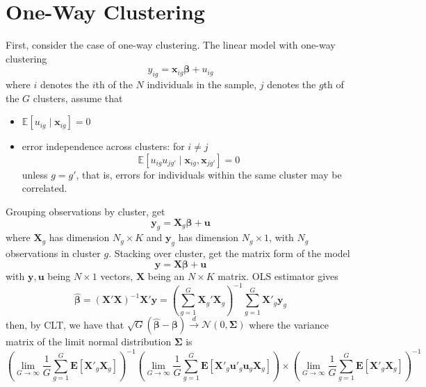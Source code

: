 \documentclass[twoside]{article}
\begin{document}

\section{One-Way Clustering}\label{sec:oneway_cluster}
First, consider the case of one-way clustering. The linear model with one-way clustering $$ y_{ig} = \mathbf{x}_{ig}\boldsymbol{\beta} + u_{ig} $$
where $i$ denotes the $i$th of the $N$ individuals in the sample, $j$ denotes the $g$th of the $G$ clusters, assume that
\begin{itemize}
    \item $\mathbb{E}\left[u_{ig}\mid \mathbf{x}_{ig}\right] =0$
    \item error independence across clusters: for $i\neq j$
    \begin{equation}\label{eq:error_independence}
        \mathbb{E}\left[ u_{ig} u_{jg'}\mid \mathbf{x}_{ig},\mathbf{x}_{jg'} \right] = 0
    \end{equation}
    unless $g=g'$, that is, errors for individuals within the same cluster may be correlated.
\end{itemize}
Grouping observations by cluster, get
$$
\mathbf{y}_g = \mathbf{X}_g \boldsymbol{\beta} + \mathbf{u}
$$
where $\mathbf{X}_g$ has dimension $N_g\times K$ and $\mathbf{y}_g$ has dimension $N_g \times 1$, with $N_g$ observations in cluster $g$. 
Stacking over cluster, get the matrix form of the model
$$
\mathbf{y=X}\boldsymbol{\beta}+\mathbf{u}
$$
with $\mathbf{y,u}$ being $N\times 1$ vectors, $\mathbf{X}$ being an $N\times K$ matrix. OLS estimator gives 
\begin{equation}\label{eq:OLSest}
    \hat{\boldsymbol{\beta}} = \left(\mathbf{X'X}\right)^{-1}\mathbf{X'y}=\left( \sum^G_{g=1}\mathbf{X}_g'\mathbf{X}_g \right)^{-1} \sum^G_{g=1}\mathbf{X}'_g\mathbf{y}_g
\end{equation}
then, by CLT, we have that $\sqrt{G} \left(\hat{\boldsymbol{\beta}}-\boldsymbol{\beta}\right) \xrightarrow{d} \mathcal{N}(0,\boldsymbol{\Sigma})$ where the variance matrix of the limit normal distribution $\boldsymbol{\Sigma}$ is 
\begin{equation}\label{eq:limit_varcovmat}
    \left( \lim_{G\rightarrow\infty}\frac{1}{G}\sum^G_{g=1} \mathbf{E}\left[\mathbf{X}'_g\mathbf{X}_g\right] \right)^{-1} \left(\lim_{G\rightarrow\infty}\frac{1}{G}\sum^G_{g=1} \mathbf{E}\left[\mathbf{X}'_g\mathbf{u}'_g\mathbf{u}_g\mathbf{X}_g\right] \right) \times \left( \lim_{G\rightarrow\infty}\frac{1}{G}\sum^G_{g=1} \mathbf{E}\left[\mathbf{X}'_g\mathbf{X}_g\right]  \right)^{-1}
\end{equation}
\end{document}
